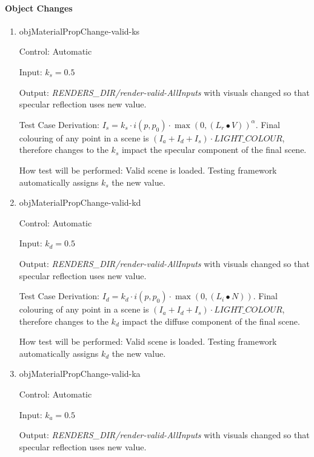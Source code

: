 \documentclass[12pt, titlepage]{article}
\begin{document}
\paragraph{Object Changes}

\begin{enumerate}
	\item{objMaterialPropChange-valid-ks\\}
	
	Control: Automatic
	
	Input: $k_{s} = 0.5$
	
	Output: \textit{RENDERS\_DIR/render-valid-AllInputs} with visuals changed 
	so that specular reflection uses new value.
	
	Test Case Derivation: $I_{s} = k_{s}\cdot i(p,p_{0}) \cdot \max(0, 
	({L_{r}}\bullet V))^\alpha$. Final colouring of any point in a scene is 
	$(I_{a}+I_{d}+I_{s})\cdot LIGHT\_COLOUR$, therefore changes to the $k_{s}$ 
	impact the specular component of the final scene.
	
	How test will be performed: Valid scene is loaded. Testing framework 
	automatically assigns $k_{s}$ the new value. 
	
	\item{objMaterialPropChange-valid-kd\\}
	
	Control: Automatic
	
	Input: $k_{d} = 0.5$
	
	Output: \textit{RENDERS\_DIR/render-valid-AllInputs} with visuals changed 
	so that specular reflection uses new value.
	
	Test Case Derivation: $I_{d} = k_{d}\cdot i(p,p_{0}) \cdot 
	\max(0,(L_{i}\bullet N))$. Final colouring of any point in a scene is 
	$(I_{a}+I_{d}+I_{s})\cdot LIGHT\_COLOUR$, therefore changes to the $k_{d}$ 
	impact the diffuse component of the final scene.
	
	How test will be performed: Valid scene is loaded. Testing framework 
	automatically assigns $k_{d}$ the new value. 	

	\item{objMaterialPropChange-valid-ka\\}
	
	Control: Automatic
	
	Input: $k_{a} = 0.5$
	
	Output: \textit{RENDERS\_DIR/render-valid-AllInputs} with visuals changed 
	so that specular reflection uses new value.
	

\end{enumerate}
\end{document}
